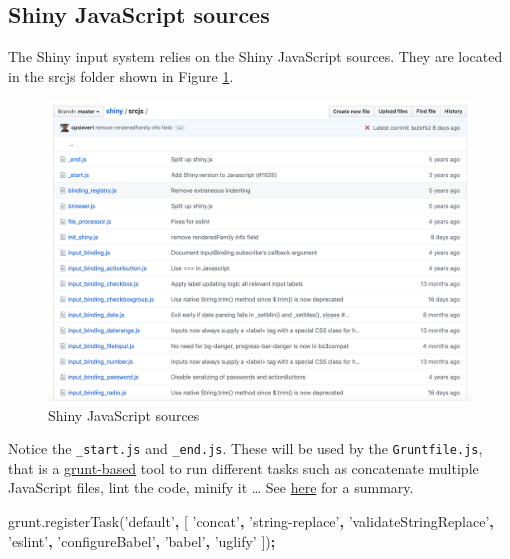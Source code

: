 \documentclass[]{book}
\newenvironment{Shaded}{\begin{snugshade}}{\end{snugshade}}
\newcommand{\AttributeTok}[1]{\textcolor[rgb]{0.77,0.63,0.00}{#1}}
\newcommand{\NormalTok}[1]{#1}
\newcommand{\OperatorTok}[1]{\textcolor[rgb]{0.81,0.36,0.00}{\textbf{#1}}}
\newcommand{\StringTok}[1]{\textcolor[rgb]{0.31,0.60,0.02}{#1}}
\newcommand{\VariableTok}[1]{\textcolor[rgb]{0.00,0.00,0.00}{#1}}
\begin{document}
\hypertarget{shiny-javascript-sources}{%
\subsection{Shiny JavaScript sources}\label{shiny-javascript-sources}}

The Shiny input system relies on the Shiny JavaScript sources. They are located in the srcjs folder shown in Figure \ref{fig:shiny-js-sources}.

\begin{figure}
\includegraphics[width=32.08in]{images/survival-kit/shiny-js-sources} \caption{Shiny JavaScript sources}\label{fig:shiny-js-sources}
\end{figure}

Notice the \texttt{\_start.js} and \texttt{\_end.js}. These will be used by the \texttt{Gruntfile.js}, that is a \href{https://gruntjs.com}{grunt-based} tool to run different tasks such as concatenate multiple JavaScript files, lint the code, minify it \ldots{} See \href{https://github.com/rstudio/shiny/tree/master/tools}{here} for a summary.

\begin{Shaded}
\begin{Highlighting}[]
\VariableTok{grunt}\NormalTok{.}\AttributeTok{registerTask}\NormalTok{(}\StringTok{'default'}\OperatorTok{,}\NormalTok{ [}
  \StringTok{'concat'}\OperatorTok{,}
  \StringTok{'string-replace'}\OperatorTok{,}
  \StringTok{'validateStringReplace'}\OperatorTok{,}
  \StringTok{'eslint'}\OperatorTok{,}
  \StringTok{'configureBabel'}\OperatorTok{,}
  \StringTok{'babel'}\OperatorTok{,}
  \StringTok{'uglify'}
\NormalTok{])}\OperatorTok{;}
\end{Highlighting}
\end{Shaded}
\end{document}

